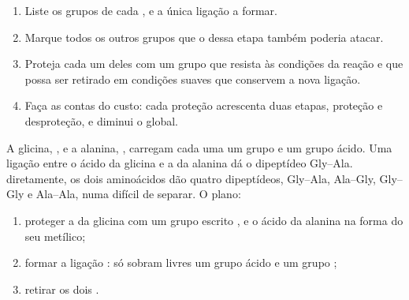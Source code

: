 \begin{method}\label{met:g12:synthesis-strategy:plan}
\begin{enumerate}
  \item Liste os grupos de cada , e a única ligação a formar.
  \item Marque todos os outros grupos que o  dessa etapa também
        poderia atacar.
  \item Proteja cada um deles com um grupo que resista às condições da
        reação e que possa ser retirado em condições suaves que
        conservem a nova ligação.
  \item Faça as contas do custo: cada proteção acrescenta duas etapas,
        proteção e desproteção, e diminui o  global.
\end{enumerate}
\end{method}

\begin{example}\label{ex:g12:synthesis-strategy:dipeptide}
A glicina, , e a alanina, , carregam
cada uma um grupo  e um grupo ácido. Uma ligação  entre o
ácido da glicina e a  da alanina dá o dipeptídeo Gly--Ala.
 diretamente, os dois aminoácidos dão quatro dipeptídeos,
Gly--Ala, Ala--Gly, Gly--Gly e Ala--Ala, numa  difícil de
separar. O plano:
\begin{enumerate}
  \item proteger a  da glicina com um grupo escrito , e o
        ácido da alanina na forma do seu  metílico;
  \item formar a ligação : só sobram livres um grupo ácido e um
        grupo ;
  \item retirar os dois .
\end{enumerate}
\end{example}

